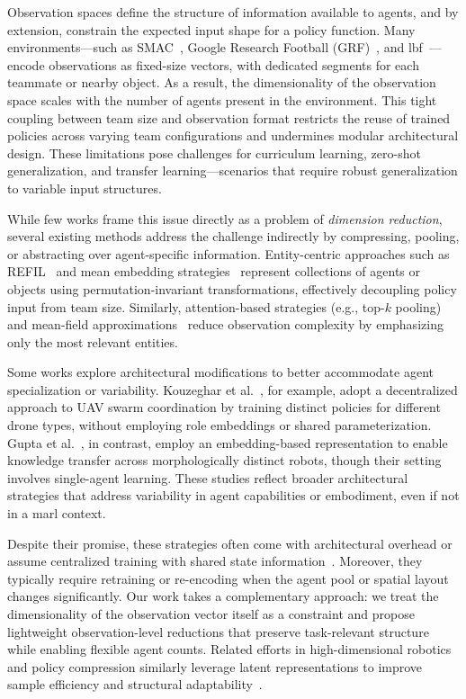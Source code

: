 \documentclass{article}
\begin{document}
Observation spaces define the structure of information available to agents, 
and by extension, constrain the expected input shape for a policy function.
Many environments—such as SMAC~\cite{samvelyan2019}, 
Google Research Football (GRF)~\cite{kurach2020}, 
and \gls{lbf}~\cite{papoudakis2021}—encode observations as fixed-size vectors, 
with dedicated segments for each teammate or nearby object. 
As a result, the dimensionality of the observation space scales with the 
number of agents present in the environment. 
This tight coupling between team size and observation format restricts the 
reuse of trained policies across varying team configurations and undermines 
modular architectural design. These limitations pose challenges for curriculum learning, 
zero-shot generalization, and transfer learning—scenarios that require robust generalization 
to variable input structures.

While few works frame this issue directly as a problem of \textit{dimension reduction}, 
several existing methods address the challenge indirectly by compressing, pooling, 
or abstracting over agent-specific information. Entity-centric approaches such as 
REFIL~\cite{iqbal2021} and mean embedding strategies~\cite{huttenrauch2019} represent 
collections of agents or objects using permutation-invariant transformations, effectively 
decoupling policy input from team size. Similarly, attention-based strategies 
(e.g., top-$k$ pooling) and mean-field approximations~\cite{yang2021a} reduce 
observation complexity by emphasizing only the most relevant entities.

Some works explore architectural modifications to better accommodate agent specialization 
or variability. Kouzeghar et al.~\cite{kouzeghar2023}, for example, adopt a decentralized 
approach to UAV swarm coordination by training distinct policies for different drone types, 
without employing role embeddings or shared parameterization. 
Gupta et al.~\cite{gupta2017a}, in contrast, employ an embedding-based representation to 
enable knowledge transfer across morphologically distinct robots, though their setting 
involves single-agent learning. These studies reflect broader architectural strategies that 
address variability in agent capabilities or embodiment, even if not in a \gls{marl} context.

Despite their promise, these strategies often come with architectural overhead or assume 
centralized training with shared state information~\cite{foerster2018}. Moreover, they typically 
require retraining or re-encoding when the agent pool or spatial layout changes significantly. 
Our work takes a complementary approach: we treat the dimensionality of the observation vector 
itself as a constraint and propose lightweight observation-level reductions that preserve 
task-relevant structure while enabling flexible agent counts. Related efforts in 
high-dimensional robotics and policy compression similarly leverage latent representations 
to improve sample efficiency and structural adaptability~\cite{bitzer2010, tangkaratt2016}.
\end{document}
